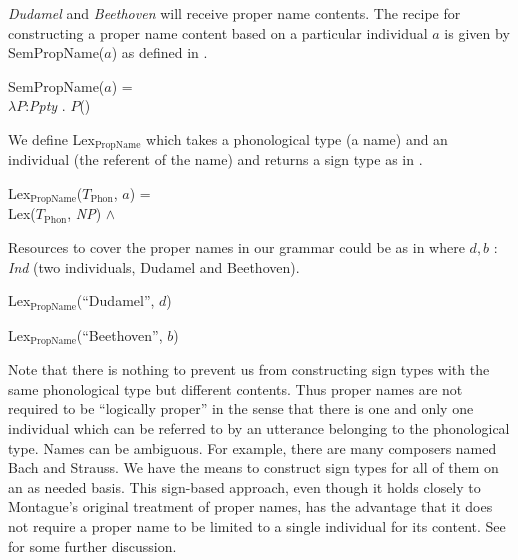 \textit{Dudamel} and
\textit{Beethoven} will receive proper name contents.  The recipe for
constructing a proper name content based on a particular individual
$a$ is given by SemPropName($a$) as defined in \nexteg{}.
\begin{ex} 
SemPropName($a$) = \\
\hspace*{1em}$\lambda P$:\textit{Ppty} . $P$() 
\end{ex} 
We define Lex$_{\mathrm{PropName}}$ which takes a phonological type (a
name) and an individual (the referent of the name) and returns a sign
type as in \nexteg{}.
\begin{ex} 
Lex$_{\mathrm{PropName}}$($T_{\mathrm{Phon}}$, $a$) = \\
\hspace*{1em}Lex($T_{\mathrm{Phon}}$, \textit{NP}) \d{$\wedge$}  
\end{ex} 
Resources to cover the proper names in our grammar could be as in
\nexteg{} where $d,b$ : \textit{Ind} (two individuals, Dudamel and
Beethoven).
\begin{ex} 
\begin{subex} 
 
\item Lex$_{\mathrm{PropName}}$(``Dudamel'', $d$) 
 
\item Lex$_{\mathrm{PropName}}$(``Beethoven'', $b$) 
 
\end{subex} 
   
\end{ex} 
Note that there is nothing to prevent us from constructing sign types
with the same phonological type but different contents.  Thus proper
names are not required to be ``logically proper'' in the sense that
there is one and only one individual which can be referred to by an
utterance belonging to the phonological type.  Names can be ambiguous.
For example, there are many composers named Bach and Strauss.  We have
the means to construct sign types for all of them on an as needed
basis.  This sign-based approach, even though it holds closely to
Montague's original treatment of proper names, has the advantage that
it does not require a proper name to be limited to a single individual
for its content.  See \cite{Cooper2017a} for some further discussion.

